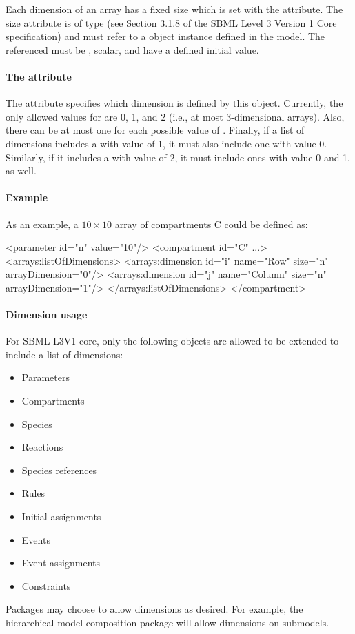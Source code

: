 Each dimension of an array has a fixed size which is set with the  attribute.  The size attribute is of type  (see Section 3.1.8 of the SBML Level 3 Version 1 Core specification) and must refer to a \Parameter object instance defined in the model.  The \Parameter referenced must be , scalar, and have a defined initial value.

\paragraph{The  attribute}

The  attribute specifies which dimension is defined by this \Dimension object.  
Currently, the only allowed values for  are 0, 1, and 2 (i.e., at most 3-dimensional arrays).  Also, there can be at most one \Dimension for each possible value of .  Finally, if a list of dimensions includes a \Dimension with  value of 1, it must also include one with value 0.  Similarly, if it includes a \Dimension with  value of 2, it must include ones with value 0 and 1, as well.  

\paragraph{Example}

As an example, a $10 \times 10$ array of compartments C could be defined as:

\begin{example}
<parameter id="n" value="10"/>
<compartment id="C" ...>
  <arrays:listOfDimensions>
    <arrays:dimension id="i" name="Row" size="n" arrayDimension="0"/>
    <arrays:dimension id="j" name="Column" size="n" arrayDimension="1"/>
  </arrays:listOfDimensions>
</compartment>
\end{example}

\paragraph{Dimension usage}

For SBML L3V1 core, only the following objects are allowed to be extended to include a list of dimensions:
\begin{itemize}
\item Parameters
\item Compartments
\item Species
\item Reactions
\item Species references
\item Rules
\item Initial assignments
\item Events
\item Event assignments
\item Constraints
\end{itemize}
Packages may choose to allow dimensions as desired.  For example, the hierarchical model composition package will allow dimensions on submodels.  

